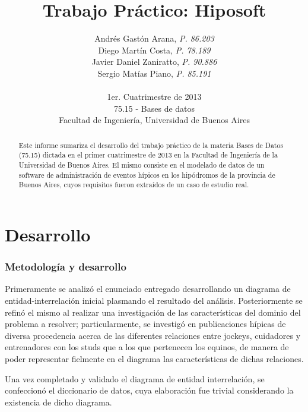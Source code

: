 \documentclass[a4paper,11pt]{article}
\title{\textbf{Trabajo Práctico: Hiposoft}}
\author{
  Andrés Gastón Arana,     \textit{P. 86.203}                      \\
  Diego Martín Costa,      \textit{P. 78.189}                      \\
  Javier Daniel Zaniratto, \textit{P. 90.886}                      \\
  Sergio Matías Piano,     \textit{P. 85.191}                      \\
  \\
  \normalsize{1er. Cuatrimestre de 2013}                           \\
  \normalsize{75.15 - Bases de datos}                              \\
  \normalsize{Facultad de Ingeniería, Universidad de Buenos Aires}
}
\date{}
\begin{document}
\thispagestyle{empty}
\maketitle

\begin{abstract}

  Este informe sumariza el desarrollo del trabajo práctico de la materia Bases
  de Datos (75.15) dictada en el primer cuatrimestre de 2013 en la Facultad de
  Ingeniería de la Universidad de Buenos Aires. El mismo consiste en el
  modelado de datos de un software de administración de eventos hípicos en los
  hipódromos de la provincia de Buenos Aires, cuyos requisitos fueron extraídos
  de un caso de estudio real.

\end{abstract}

\clearpage

\tableofcontents
\clearpage


\part{Desarrollo}

\section{Metodología y desarrollo}

Primeramente se analizó el enunciado entregado desarrollando un diagrama de
entidad-interrelación inicial plasmando el resultado del análisis.
Posteriormente se refinó el mismo al realizar una investigación de las
características del dominio del problema a resolver; particularmente, se
investigó en publicaciones hípicas de diversa procedencia acerca de las
diferentes relaciones entre jockeys, cuidadores y entrenadores con los studs
que a los que pertenecen los equinos, de manera de poder representar fielmente
en el diagrama las características de dichas relaciones.

Una vez completado y validado el diagrama de entidad interrelación, se
confeccionó el diccionario de datos, cuya elaboración fue trivial considerando
la existencia de dicho diagrama.
\end{document}
